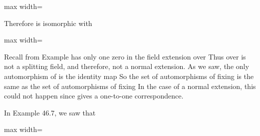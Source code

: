 \documentclass[11pt,oneside]{article}
\begin{document}
\begin{BookBody}
\begin{center}\begin{adjustbox}{max width=\linewidth}\end{adjustbox}\end{center}

\noindent Therefore  is isomorphic with

\begin{center}\begin{adjustbox}{max width=\linewidth}\end{adjustbox}\end{center} \BookEnd{\blacklozenge}

 Recall from Example  has only one zero in the field extension  over  Thus  over  is not a splitting field, and therefore, not a normal extension. As we saw, the only automorphism of  is the identity map  So the set of automorphisms of  fixing  is the same as the set of automorphisms of  fixing  In the case of a normal extension, this could not happen since \BookInline{\lambda } gives a one-to-one correspondence.

In Example 46.7, we saw that

\begin{center}\begin{adjustbox}{max width=\linewidth}\end{adjustbox}\end{center}

\end{BookBody}

\BookNarrativetrue
\end{document}
